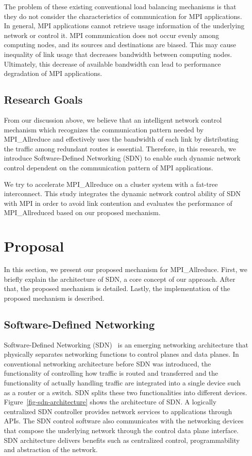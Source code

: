 The problem of these existing conventional load balancing mechanisms is
that they do not consider the characteristics of communication for MPI
applications. In general, MPI applications cannot retrieve usage
information of the underlying network or control it. MPI communication
does not occur evenly among computing nodes, and its sources and
destinations are biased. This may cause inequality of link usage that
decreases bandwidth between computing nodes. Ultimately, this decrease
of available bandwidth can lead to performance degradation of MPI
applications.

\subsection{Research Goals}

From our discussion above, we believe that an intelligent network control
mechanism which recognizes the communication pattern needed by MPI\_Allreduce
and effectively uses the bandwidth of each link by distributing the traffic
among redundant routes is essential. Therefore, in this research, we introduce
Software-Defined Networking (SDN) to enable such dynamic network control
dependent on the communication pattern of MPI applications.

We try to accelerate MPI\_Allreduce on a cluster system with a fat-tree
interconnect. This study integrates the dynamic network control ability of SDN
with MPI in order to avoid link contention and evaluates the performance of
MPI\_Allreduced based on our proposed mechanism.

\section{Proposal}\label{iii-proposal}

In this section, we present our proposed mechanism for
MPI\_Allreduce. First, we briefly explain the architecture of
SDN, a core concept of our approach. After that, the proposed mechanism
is detailed. Lastly, the implementation of the proposed mechanism is
described.

\subsection{Software-Defined Networking}

Software-Defined Networking (SDN)~\autocite{sdn} is an emerging networking
architecture that physically separates networking functions to control
planes and data planes. In conventional networking architecture before
SDN was introduced, the functionality of controlling how traffic is
routed and transferred and the functionality of actually handling
traffic are integrated into a single device such as a router or a
switch. SDN splits these two functionalities into different devices.
Figure~\ref{fig-sdn-architecture} shows the architecture of SDN\@. A
logically centralized SDN controller provides network services to
applications through APIs. The SDN control software also communicates
with the networking devices that compose the underlying network through
the control data plane interface. SDN architecture delivers benefits
such as centralized control, programmability and abstraction of the
network.

